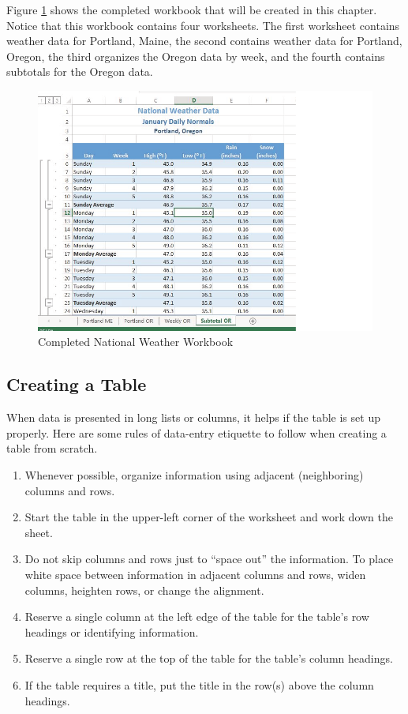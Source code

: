 Figure \ref{05:fig01} shows the completed workbook that will be created in this chapter. Notice that this workbook contains four worksheets. The first worksheet contains weather data for Portland, Maine, the second contains weather data for Portland, Oregon, the third organizes the Oregon data by week, and the fourth contains subtotals for the Oregon data.

\begin{figure}[H]
	\centering
	\includegraphics[width=\maxwidth{.95\linewidth}]{gfx/ch05_fig01}
	\caption{Completed National Weather Workbook}
	\label{05:fig01}
\end{figure}

\subsection{Creating a Table}

When data is presented in long lists or columns, it helps if the table is set up properly. Here are some rules of data-entry etiquette to follow when creating a table from scratch.

\begin{enumerate}
	\item Whenever possible, organize information using adjacent (neighboring) columns and rows.
	\item Start the table in the upper-left corner of the worksheet and work down the sheet.
	\item Do not skip columns and rows just to ``space out'' the information. To place white space between information in adjacent columns and rows, widen columns, heighten rows, or change the alignment.
	\item Reserve a single column at the left edge of the table for the table's row headings or identifying information.
	\item Reserve a single row at the top of the table for the table's column headings.
	\item If the table requires a title, put the title in the row(s) above the column headings.
\end{enumerate}


